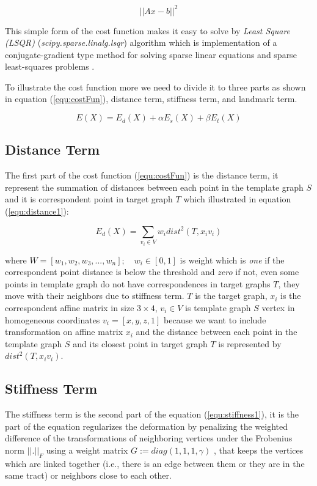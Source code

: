 \documentclass[../structure.tex]{subfiles}
\begin{document}
\begin{equation}
\label{equ:equation1}
||Ax-b||^2
\end{equation}

This simple form of the cost function makes it easy to solve by \textit{Least Square (LSQR)} (\textit{scipy.sparse.linalg.lsqr}) algorithm which is implementation of a conjugate-gradient type method for solving sparse linear equations and sparse least-squares problems \cite{Paige1982a}.

To illustrate the cost function more we need to divide it to three parts as shown in equation (\ref{equ:costFun}), distance term, stiffness term, and landmark term.

\begin{equation}
E(X) = E_{d}(X) + \alpha E_{s}(X) + \beta E_{t}(X)
\label{equ:costFun}
\end{equation}

\subsection{Distance Term}
\hspace{2em}The first part of the cost function (\ref{equ:costFun}) is the distance term, it represent the summation of distances between each point in the template graph $S$ and it is correspondent point in target graph $T$ which illustrated in equation (\ref{equ:distance1}):

\begin{equation}
E_{d}(X) = \sum_{v_{i} \in V} w_{i}dist^2(T,x_{i}v_{i})
\label{equ:distance1}
\end{equation}

where $W = [w_{1}, w_{2}, w_{3}, ..., w_{n}];\quad w_{i}\in [0,1]$ is weight which is \textit{one} if the correspondent point distance is below the threshold and \textit{zero} if not, even some points in template graph do not have correspondences in target graphs $T$, they move with their neighbors due to stiffness term. $T$ is the target graph, $x_{i}$ is the correspondent affine matrix in size $3\times4$, $v_{i}\in V$ is template graph $S$ vertex in homogeneous coordinates $v_{i} = [x,y,z,1]$ because we want to include transformation on affine matrix $x_{i}$ and the distance between each point in the template graph $S$ and its closest point in target graph $T$ is represented by $dist^2(T,x_{i}v_{i})$.

\subsection{Stiffness Term}
\hspace{2em}The stiffness term is the second part of the equation (\ref{equ:stiffness1}), it is the part of the equation regularizes the deformation by penalizing the weighted difference of the transformations of neighboring vertices under the Frobenius norm $||.||_{F}$ using a weight matrix $G := diag(1, 1, 1, \gamma)$ \cite{Amberg2007}, that keeps the vertices which are linked together (i.e., there is an edge between them or they are in the same tract) or neighbors close to each other.
\end{document}
